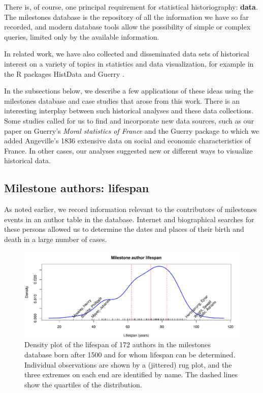 \documentclass[11pt]{article}
\begin{document}
There is, of course,  one principal requirement for statistical historiography: \textbf{data}.
The milestones database is the repository of all the information we have so far recorded,
and modern database tools allow the possibility of simple or complex queries, limited only
by the available information.

In related work, we have also collected and disseminated
data sets of historical interest on a variety of
topics in statistics and data visualization, for example in the R packages
HistData \citep{HistData} and Guerry \citep{Guerry}.

In the subsections below, we describe a few applications of these ideas using the milestones
database and case studies that arose from this work. There is an interesting interplay between
such historical analyses and these data collections. Some studies called for us to find and
incorporate new data sources, such as our paper \citep{Friendly:2007:guerry} on
Guerry's \emph{Moral statistics of France} and the Guerry package to which we added
Angeville's 1836
extensive data on social and economic characteristics of France.
In other cases, our analyses suggested new or different ways to visualize historical data.

\subsection{Milestone authors: lifespan}\label{sec:lifespan}
As noted earlier, we record information relevant to the contributors of milestones events in an
author table in the database. Internet and biographical searches for these persons allowed us
to determine the dates and places of their birth and death in a large number of cases.

\begin{figure}[!htb]
  \centering
  \includegraphics[width=\textwidth,clip]{fig/lifespan}
  \caption{Density plot of the lifespan of 172 authors in the milestones database born after 1500 and for whom
  lifespan can be determined. Individual observations are shown by a (jittered) rug plot, and the three extremes
  on each end are identified by name.  The dashed lines show the quartiles of the distribution.
  }
  \label{fig:lifespan}
\end{figure}
\end{document}
